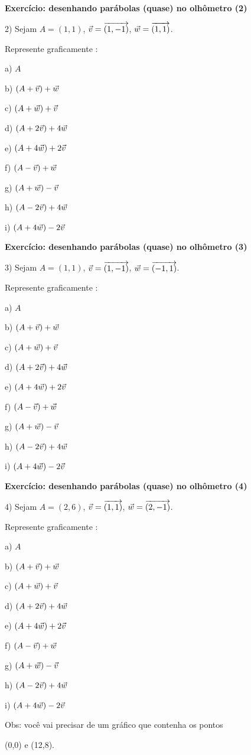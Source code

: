 \documentclass[oneside,12pt]{article}
\begin{document}
\newpage


{\bf Exercício: desenhando parábolas (quase) no olhômetro (2)}

2) Sejam $A=(1,1)$, ${\vec v} = {\overrightarrow{(1,-1)}}$, ${\vec w} = {\overrightarrow{(1,1)}}$.

Represente graficamente :

a) $A$

b) $(A+{\vec v})+{\vec w}$

c) $(A+{\vec w})+{\vec v}$

d) $(A+2{\vec v})+4{\vec w}$

e) $(A+4{\vec w})+2{\vec v}$

f) $(A-{\vec v})+{\vec w}$

g) $(A+{\vec w})-{\vec v}$

h) $(A-2{\vec v})+4{\vec w}$

i) $(A+4{\vec w})-2{\vec v}$

\newpage


{\bf Exercício: desenhando parábolas (quase) no olhômetro (3)}

3) Sejam $A=(1,1)$, ${\vec v} = {\overrightarrow{(1,-1)}}$, ${\vec w} = {\overrightarrow{(-1,1)}}$.

Represente graficamente :

a) $A$

b) $(A+{\vec v})+{\vec w}$

c) $(A+{\vec w})+{\vec v}$

d) $(A+2{\vec v})+4{\vec w}$

e) $(A+4{\vec w})+2{\vec v}$

f) $(A-{\vec v})+{\vec w}$

g) $(A+{\vec w})-{\vec v}$

h) $(A-2{\vec v})+4{\vec w}$

i) $(A+4{\vec w})-2{\vec v}$


\newpage


{\bf Exercício: desenhando parábolas (quase) no olhômetro (4)}

4) Sejam $A=(2,6)$, ${\vec v} = {\overrightarrow{(1,1)}}$, ${\vec w} = {\overrightarrow{(2,-1)}}$.

Represente graficamente :

a) $A$

b) $(A+{\vec v})+{\vec w}$

c) $(A+{\vec w})+{\vec v}$

d) $(A+2{\vec v})+4{\vec w}$

e) $(A+4{\vec w})+2{\vec v}$

f) $(A-{\vec v})+{\vec w}$

g) $(A+{\vec w})-{\vec v}$

h) $(A-2{\vec v})+4{\vec w}$

i) $(A+4{\vec w})-2{\vec v}$

\msk

Obs: você vai precisar de um gráfico que contenha os pontos

(0,0) e (12,8).












\end{document}
